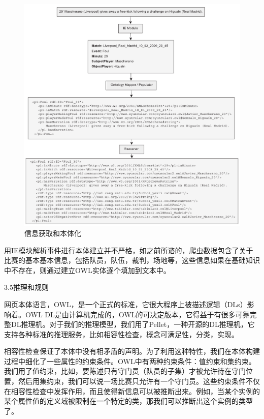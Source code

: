	\begin{figure}[htbp] 
	\centering\includegraphics[width=6in]{fig/trans/fig4.png} 
	\caption[]{\xiaosihao 信息获取和本体化}
	\end{figure} 

用{\Times IE}模块解析事件进行本体建立并不严格，如之前所谘的，爬虫数据包含了关于比赛的基本基本信息，包括队员，队伍，裁判，场地等，这些信息如果在基础知识中不存在，则通过建立{\Times OWL}实体逐个填加到文本中。

3.5推理和规则

网页本体语言，{\Times OWL}，是一个正式的标准，它很大程序上被描述逻辑（{\Times DLs}）影响着。{\Times OWL DL}是由计算机完成的，{\Times OWL}的可决定版本，它得益于有很多可靠完整{\Times DL}推理机。对于我们的推理模型，我们用了{\Times Pellet}，一种开源的{\Times DL}推理机，它支持各种标准的推理服务，比如相容性检查，概念可满足性，分类，实现。

相容性检查保证了本体中没有相矛盾的声明。为了利用这种特性，我们在本体构建过程中细化了一些属性的约束条件。{\Times OWL}中有两种约束条件：值约束和集约束。我们用了值约束，比如，要陈述只有守门员（队员的子集）才被允许待在守门位置，然后用集约束，我们可以说一场比赛只允许有一个守门员。这些约束条件不仅在相容性检查中发挥作用，而且使得新信息可以被推断出来。例如，当某个实例的某个属性值的定义域被限制在一个特定的类，那我们可以推断出这个实例的类型了。

